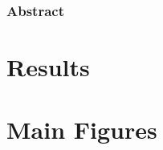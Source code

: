 \documentclass{article}
\begin{document}

\clearpage

\clearpage

\clearpage

\clearpage

\clearpage




\begin{center}
\subsubsection*{Abstract}
\end{center}
\label{sec:abstract}

\clearpage

\linenumbers

% 

\section{Results}
\label{sec:results}


% 

% 


\section{Main Figures}
\label{sec:figures}

\clearpage

\restoregeometry

% 

% 
% 
% 
% 
% 
% 
% 
\end{document}
